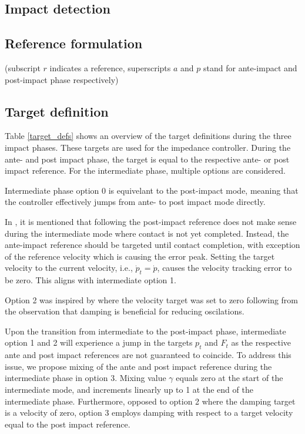 \documentclass[a4paper, 10pt, conference]{ieeeconf}
\begin{document}
    \subsection{Impact detection}

    \subsection{Reference formulation}
    (subscript $r$ indicates a reference, superscripts $a$ and $p$ stand for ante-impact and post-impact phase respectively)
    \subsection{Target definition}
    Table \ref{target_defs} shows an overview of the target definitions during the three impact phases. These targets are used for the impedance controller. During the ante- and post impact phase, the target is equal to the respective ante- or post impact reference. For the intermediate phase, multiple options are considered.

    Intermediate phase option 0 is equivelant to the post-impact mode, meaning that the controller effectively jumps from ante- to post impact mode directly.

    In \cite{vansteenRobotControlSimultaneous2021}, it is mentioned that following the post-impact reference does not make sense during the intermediate mode where contact is not yet completed. Instead, the ante-impact reference should be targeted until contact completion, with exception of the reference velocity which is causing the error peak. Setting the target velocity to the current velocity, i.e., $\dot{p}_t=\dot{p}$, causes the velocity tracking error to be zero. This aligns with intermediate option 1.

    Option 2 was inspired by \cite{uitendaalTeachingRobotsInteraction2022} where the velocity target was set to zero following from the observation that damping is beneficial for reducing oscilations. 

    Upon the transition from intermediate to the post-impact phase, intermediate option 1 and 2 will experience a jump in the targets $p_t$ and $F_t$ as the respective ante and post impact references are not guaranteed to coincide. To address this issue, we propose mixing of the ante and post impact reference during the intermediate phase in option 3. Mixing value $\gamma$ equals zero at the start of the intermediate mode, and increments linearly up to 1 at the end of the intermediate phase. Furthermore, opposed to option 2 where the damping target is a velocity of zero, option 3 employs damping with respect to a target velocity equal to the post impact reference.
\end{document}
